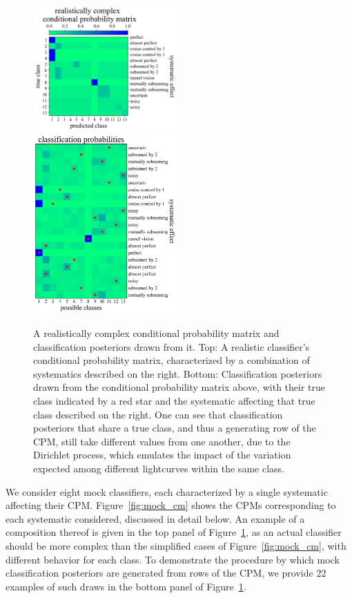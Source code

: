 \begin{figure}
	\begin{center}
		\includegraphics[width=0.49\textwidth]{./fig/combined.png}\\
    \includegraphics[width=0.49\textwidth]{./fig/examples.png}
		\caption{A realistically complex conditional probability matrix and classification posteriors drawn from it.
		Top: A realistic classifier's conditional probability matrix, characterized by a combination of systematics described on the right.
		Bottom: Classification posteriors drawn from the conditional probability matrix above, with their true class indicated by a red star and the systematic affecting that true class described on the right.
		One can see that classification posteriors that share a true class, and thus a generating row of the CPM, still take different values from one another, due to the Dirichlet process, which emulates the impact of the variation expected among different lightcurves within the same class.
		}
		\label{fig:mock_probs}
	\end{center}
\end{figure}

We consider eight mock classifiers, each characterized by a single systematic affecting their CPM.
Figure~\ref{fig:mock_cm} shows the CPMs corresponding to each systematic considered, discussed in detail below.
An example of a composition thereof is given in the top panel of Figure~\ref{fig:mock_probs}, as an actual classifier should be more complex than the simplified cases of Figure~\ref{fig:mock_cm}, with different behavior for each class.
To demonstrate the procedure by which mock classification posteriors are generated from rows of the CPM, we provide 22 examples of such draws in the bottom panel of Figure~\ref{fig:mock_probs}.

